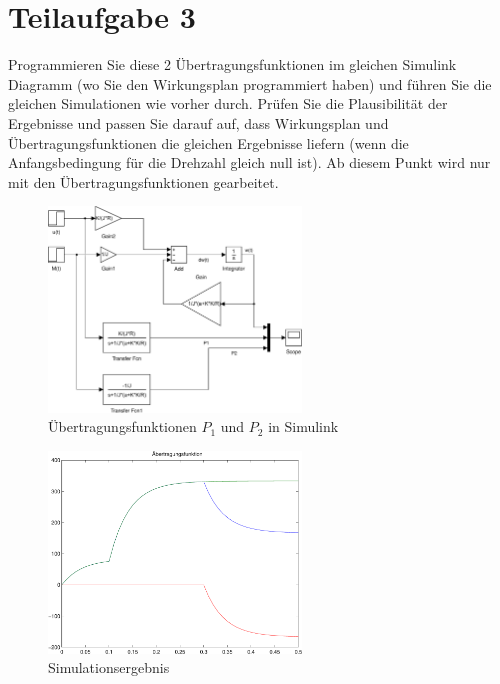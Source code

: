 \section{Teilaufgabe 3}
\begin{aufgabe}
    Programmieren Sie diese 2 Übertragungsfunktionen im gleichen Simulink 
    Diagramm (wo Sie den Wirkungsplan programmiert haben) und führen Sie die 
    gleichen Simulationen wie vorher durch. Prüfen Sie die Plausibilität der 
    Ergebnisse und passen Sie darauf auf, dass Wirkungsplan und 
    Übertragungsfunktionen die gleichen Ergebnisse liefern (wenn die 
    Anfangsbedingung für die Drehzahl gleich null ist). Ab diesem Punkt wird 
    nur mit den Übertragungsfunktionen gearbeitet.
\end{aufgabe}
\begin{figure}[h!]
    \centering
    \includegraphics[width=0.6\textwidth]{03/transfer.pdf}
    \caption{Übertragungsfunktionen $P_1$ und $P_2$ in Simulink}
    \label{fig:03}
\end{figure}
\begin{figure}[h!]
    \centering
    \includegraphics[width=0.6\textwidth]{03/transfer_plot.pdf}
    \caption{Simulationsergebnis}
    \label{fig:03plot}
\end{figure}
